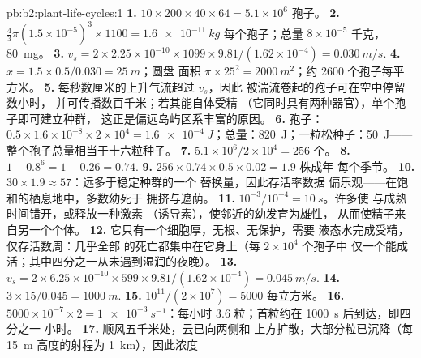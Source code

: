 \begin{solution}{pb:b2:plant-life-cycles:1}
\textbf{1.} $10\times 200\times 40\times 64 = 5.1\times 10^{6}$
孢子。
\textbf{2.} $\tfrac43\pi(1.5\times 10^{-5})^3\times 1100 =
\qty{1.6e-11}{kg}$ 每个孢子；总量 $8\times 10^{-5}$ 千克，\qty{80}{mg}。
\textbf{3.} $v_s = 2\times 2.25\times 10^{-10}\times 1099\times
9.81/(1.62\times 10^{-4}) = \qty{0.030}{m/s}$.
\textbf{4.} $x = 1.5\times 0.5/0.030 = \qty{25}{m}$；圆盘
面积 $\pi\times 25^2 = \qty{2000}{m^2}$；约
\num{2600} 个孢子每平方米。
\textbf{5.} 每秒数厘米的上升气流超过 $v_s$，因此
被湍流卷起的孢子可在空中停留数小时，
并可传播数百千米；若其能自体受精
（它同时具有两种器官），单个孢子即可建立种群，
这正是偏远岛屿区系丰富的原因。
\textbf{6.} 孢子：$0.5\times 1.6\times 10^{-8}\times 2\times 10^{4} =
\qty{1.6e-4}{J}$；总量：\qty{820}{J}；一粒松种子：\qty{50}{J}——
整个孢子总量相当于十六粒种子。
\textbf{7.} $5.1\times 10^{6}/2\times 10^{4} = 256$ 个。
\textbf{8.} $1 - 0.8^{6} = 1 - 0.26 = 0.74$.
\textbf{9.} $256\times 0.74\times 0.5\times 0.02 = 1.9$ 株成年
每个季节。
\textbf{10.} $30\times 1.9 \approx 57$：远多于稳定种群的一个
替换量，因此存活率数据
偏乐观——在饱和的栖息地中，多数幼死于
拥挤与遮荫。
\textbf{11.} $10^{-3}/10^{-4} = \qty{10}{s}$。许多使
与成熟时间错开，或释放一种激素
（诱导素），使邻近的幼发育为雄性，
从而使精子来自另一个个体。
\textbf{12.} 它只有一个细胞厚，无根、无保护，需要
液态水完成受精，仅存活数周：几乎全部
的死亡都集中在它身上（每 $2\times 10^{4}$ 个孢子中
仅一个能成活；其中四分之一从未遇到湿润的夜晚）。
\textbf{13.} $v_s = 2\times 6.25\times 10^{-10}\times 599\times
9.81/(1.62\times 10^{-4}) = \qty{0.045}{m/s}$.
\textbf{14.} $3\times 15/0.045 = \qty{1000}{m}$.
\textbf{15.} $10^{11}/(2\times 10^{7}) = \num{5000}$ 每立方米。
\textbf{16.} $5000\times 10^{-7}\times 2 = \qty{1e-3}{s^{-1}}$：每小时
3.6 粒；首粒约在 \qty{1000}{s} 后到达，即四分之一
小时。
\textbf{17.} 顺风五千米处，云已向两侧和
上方扩散，大部分粒已沉降（每 \qty{15}{m}
高度的射程为 \qty{1}{km}），因此浓度

\end{solution}
